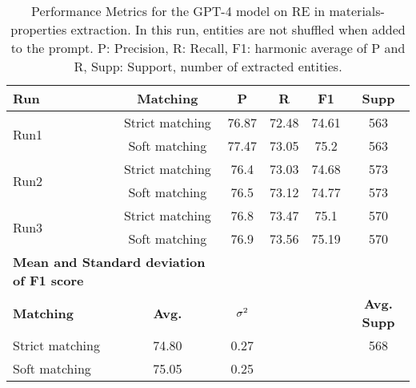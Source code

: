 \begin{table}[htbp]
    \small
    \centering
    \caption{Performance Metrics for the GPT-4 model on RE in materials-properties extraction. In this run, entities are not shuffled when added to the prompt. P: Precision, R: Recall, F1: harmonic average of P and R, Supp: Support, number of extracted entities.}
    \begin{tabular}{lccccc}
        \toprule
        \textbf{Run} & \textbf{Matching} & \textbf{P} & \textbf{R} & \textbf{F1} & \textbf{Supp} \\
        \midrule
        \multirow{2}{*}{Run1} & Strict matching & 76.87 & 72.48 & 74.61 & 563 \\
        & Soft matching & 77.47 & 73.05 & 75.2 & 563 \\
        \midrule
        \multirow{2}{*}{Run2} & Strict matching & 76.4 & 73.03 & 74.68 & 573 \\
        & Soft matching & 76.5 & 73.12 & 74.77 & 573 \\
        \midrule
        \multirow{2}{*}{Run3} & Strict matching & 76.8 & 73.47 & 75.1 & 570 \\
        & Soft matching & 76.9 & 73.56 & 75.19 & 570 \\
        \midrule
        \multicolumn{2}{l}{\textbf{Mean and Standard deviation of F1 score}} & & & & \\
        \midrule
        \textbf{Matching} & \textbf{Avg.} & $\sigma\textsuperscript{2}$ & & & \textbf{Avg. Supp}\\
        Strict matching & 74.80 & 0.27 & & & 568 \\
        Soft matching & 75.05 & 0.25 & & \\
        \bottomrule
    \end{tabular}
\end{table}

